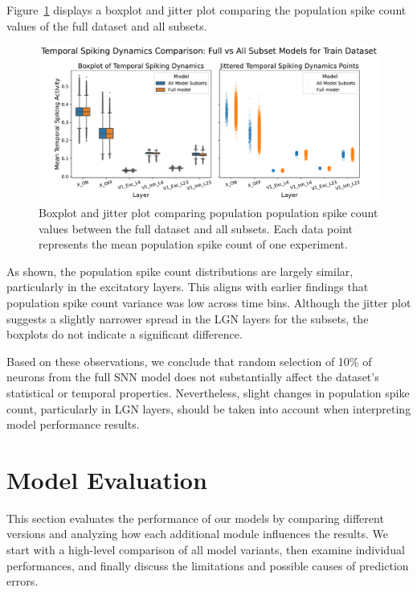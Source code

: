 Figure~\ref{fig:boxplot_synchrony_subset} displays a boxplot and jitter plot comparing the population spike count values of the full dataset and all subsets.

\begin{figure}
    \centering
    \includegraphics[width=\linewidth]{img/plots/synchrony_comparison_subset_full_train.pdf}
    \caption{Boxplot and jitter plot comparing population population spike count values between the full dataset and all subsets. Each data point represents the mean population spike count of one experiment.}
    \label{fig:boxplot_synchrony_subset}
\end{figure}

As shown, the population spike count distributions are largely similar, particularly in the excitatory layers. This aligns with earlier findings that population spike count variance was low across time bins. Although the jitter plot suggests a slightly narrower spread in the LGN layers for the subsets, the boxplots do not indicate a significant difference.

Based on these observations, we conclude that random selection of 10\% of neurons from the full SNN model does not substantially affect the dataset's statistical or temporal properties. Nevertheless, slight changes in population spike count, particularly in LGN layers, should be taken into account when interpreting model performance results.

\section{Model Evaluation}
\label{sec:model_evaluation}

This section evaluates the performance of our models by comparing different versions and analyzing how each additional module influences the results. We start with a high-level comparison of all model variants, then examine individual performances, and finally discuss the limitations and possible causes of prediction errors.

